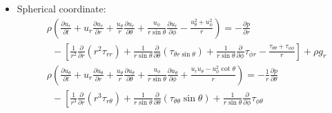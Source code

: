 \documentclass[../main.tex]{subfiles}
\begin{document}
\begin{itemize}
\begin{itemize}
\begin{align}
          \frac{1}{r^2}\frac{\partial}{\partial r}\left(r^2\tau_{r\theta}\right) + \frac{1}{r}\frac{\partial}{\partial \theta}\tau_{\theta\theta}
          + \frac{\partial}{\partial z}\tau_{z\theta} + \frac{\tau_{\theta r} -\tau_{r\theta}}{r}
        \right] + \rho g_{\theta} \\
        &\rho\left(
          \frac{\partial u_z}{\partial t}  + u_r\frac{\partial u_z}{\partial r} + \frac{u_{\theta}}{r}\frac{\partial u_z}{\partial \theta} + u_z\frac{\partial u_z}{\partial z}
        \right) = - \frac{\partial p}{\partial z} \nonumber\\
        &\phantom{\rho\left(\frac{\partial u_z}{\partial t}\right)}-\left[
          \frac{1}{r}\frac{\partial}{\partial r}\left(r\tau_{rz}\right) + \frac{1}{r}\frac{\partial}{\partial \theta}\tau_{\theta z}
          + \frac{\partial}{\partial z}\tau_{zz}
        \right] + \rho g_z
      \end{align}
    \item Spherical coordinate:
      \begin{align}
        &\rho\left(
          \frac{\partial u_r}{\partial t}  + u_r\frac{\partial u_r}{\partial r} + \frac{u_{\theta}}{r}\frac{\partial u_r}{\partial \theta}
          + \frac{u_{\phi}}{r\sin\theta}\frac{\partial u_r}{\partial \phi}
          - \frac{u_{\theta}^2 + u_{\phi}^2}{r}
        \right) = - \frac{\partial p}{\partial r} \nonumber\\
        &\phantom{\rho}-\left[
          \frac{1}{r^2}\frac{\partial}{\partial r}\left(r^2\tau_{rr}\right) 
          + \frac{1}{r\sin\theta}\frac{\partial}{\partial \theta}\left(\tau_{\theta r\sin\theta}\right)
          + \frac{1}{r\sin\theta}\frac{\partial}{\partial \phi}\tau_{\phi r} - \frac{\tau_{\theta\theta} + \tau_{\phi\phi}}{r}
        \right] + \rho g_r \\
        &\rho\left(
          \frac{\partial u_{\theta}}{\partial t}  + u_r\frac{\partial u_{\theta}}{\partial r} 
          + \frac{u_{\theta}}{r}\frac{\partial u_{\theta}}{\partial \theta} 
          + \frac{u_{\phi}}{r\sin\theta}\frac{\partial u_{\theta}}{\partial \phi}
          + \frac{u_r u_{\theta} - u_{\phi}^2\cot\theta}{r}
        \right) = - \frac{1}{r}\frac{\partial p}{\partial \theta} \nonumber\\
        &\phantom{\rho}-\left[
          \frac{1}{r^3}\frac{\partial}{\partial r}\left(r^3\tau_{r\theta}\right)
          + \frac{1}{r\sin\theta}\frac{\partial}{\partial \theta}\left(\tau_{\theta\theta}\sin\theta\right)
          + \frac{1}{r\sin\theta}\frac{\partial}{\partial \phi}\tau_{\phi\theta}

\end{align}
\end{itemize}
\end{itemize}
\end{document}
